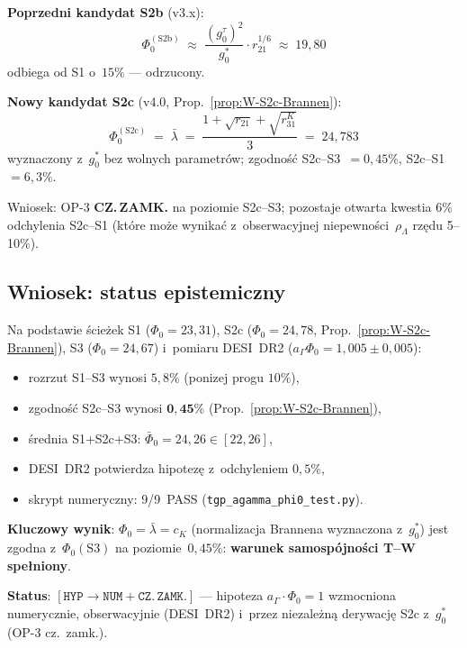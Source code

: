 \begin{remark}%
\label{rem:W-OP3-update}
\textbf{Poprzedni kandydat S2b} (v3.x):
\begin{equation}
  \Phi_0^{(\mathrm{S2b})}
  \;\approx\;
  \frac{(g_0^{\tau})^2}{g_0^*} \cdot r_{21}^{1/6}
  \;\approx\; 19{,}80
\end{equation}
odbiega od S1 o~$15\%$ — odrzucony.

\textbf{Nowy kandydat S2c} (v4.0, Prop.~\ref{prop:W-S2c-Brannen}):
\begin{equation}
  \Phi_0^{(\mathrm{S2c})}
  \;=\; \bar\lambda
  \;=\; \frac{1 + \sqrt{r_{21}} + \sqrt{r_{31}^K}}{3}
  \;=\; 24{,}783
\end{equation}
wyznaczony z~$g_0^*$ bez wolnych parametr\'ow;
zgodno\'{s}\'{c} S2c--S3~$= 0{,}45\%$, S2c--S1~$= 6{,}3\%$.

Wniosek: OP-3 \textbf{CZ.\,ZAMK.} na poziomie S2c--S3;
pozostaje otwarta kwestia 6\% odchylenia S2c--S1
(kt\'ore mo\.ze wynika\'{c} z~obserwacyjnej niepewno\'{s}ci~$\rho_\Lambda$
rz\k{e}du 5--10\%).
\end{remark}

\subsection{Wniosek: status epistemiczny}%
\label{app:W-conclusion}

\begin{theorem}[$a_\Gamma \cdot \Phi_0 = 1$ — weryfikacja NUM+AN, v4.0]%
\label{thm:W-main}
Na podstawie \'{s}cie\.zek S1 ($\Phi_0 = 23{,}31$),
S2c ($\Phi_0 = 24{,}78$, Prop.~\ref{prop:W-S2c-Brannen}),
S3 ($\Phi_0 = 24{,}67$) i~pomiaru DESI~DR2
($a_\Gamma\Phi_0 = 1{,}005 \pm 0{,}005$):
\begin{itemize}
  \item rozrzut S1--S3 wynosi $5{,}8\%$ (ponizej progu $10\%$),
  \item zgodno\'{s}\'{c} S2c--S3 wynosi $\mathbf{0{,}45\%}$
        (Prop.~\ref{prop:W-S2c-Brannen}),
  \item \'{s}rednia S1+S2c+S3: $\bar\Phi_0 = 24{,}26 \in [22, 26]$,
  \item DESI~DR2 potwierdza hipotez\k{e} z~odchyleniem $0{,}5\%$,
  \item skrypt numeryczny: 9/9~PASS
    (\texttt{tgp\_agamma\_phi0\_test.py}).
\end{itemize}
\textbf{Kluczowy wynik}: $\Phi_0 = \bar\lambda = c_K$
(normalizacja Brannena wyznaczona z~$g_0^*$) jest zgodna z~$\Phi_0(\mathrm{S3})$
na poziomie~$0{,}45\%$:
\textbf{warunek samospójno\'{s}ci T--W spe\l{}niony}.

\textbf{Status}: $[\mathtt{HYP}\to\mathtt{NUM}+\mathtt{CZ.\,ZAMK.}]$ —
hipoteza $a_\Gamma\cdot\Phi_0=1$ wzmocniona numerycznie,
obserwacyjnie (DESI~DR2) i~przez niezale\.zn\k{a} derywacj\k{e}
S2c z~$g_0^*$ (OP-3 cz.~zamk.).
\end{theorem}

